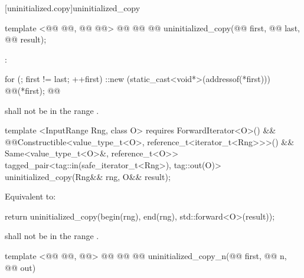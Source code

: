 [uninitialized.copy]{uninitialized_copy}
\begin{codeblock}
  template <@@ @@, @@
            @@>
    @@
             @@
  @@
    uninitialized_copy(@@ first, @@ last, @@ result);
\end{codeblock}

\setcounter{Paras}{0}
\pnum
\effects {}:
\begin{codeblock}
        for (; first != last; ++first)
          ::new (static_cast<void*>(addressof(*first)))
            @@(*first);
        @@
\end{codeblock}

{\color{addclr}
\pnum
\requires {} shall not be in the range \tcode{[first, last)}.

\begin{codeblock}
  template <InputRange Rng, class O>
    requires ForwardIterator<O>() &&
             @@Constructible<value_type_t<O>, reference_t<iterator_t<Rng>>>() &&
             Same<value_type_t<O>&, reference_t<O>>
  tagged_pair<tag::in(safe_iterator_t<Rng>), tag::out(O)>
    uninitialized_copy(Rng&& rng, O&& result);
\end{codeblock}

\pnum
\effects Equivalent to:
\begin{codeblock}
        return uninitialized_copy(begin(rng), end(rng), std::forward<O>(result));
\end{codeblock}
\pnum
\requires {} shall not be in the range \tcode{[first, last)}.
} %

\begin{codeblock}
  template <@@ @@, @@>
    @@
             @@
  @@
    uninitialized_copy_n(@@ first, @@ n,
                         @@ out)
\end{codeblock}

